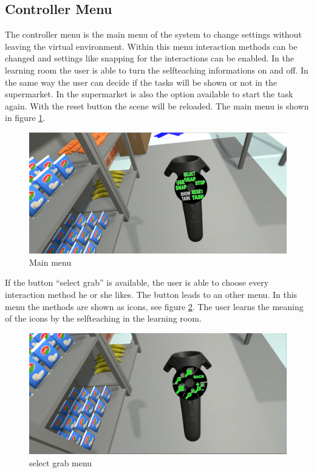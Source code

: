 \subsection{Controller Menu} \label{sec:Menu}
The controller menu is the main menu of the system to change settings without leaving the virtual environment. Within this menu interaction methods can be changed and settings like snapping for the interactions can be enabled. In the learning room	the user is able to turn the selfteaching informations on and off. In the same way the user can decide if the tasks will be shown or not in the supermarket. In the supermarket is also the option available to start the task again. With the reset button the scene will be reloaded. The main menu is shown in figure \ref{fig:mainMenu}.

\begin{figure}[H] 
	\center 
	\includegraphics[width=12cm]{Images/Menu1.PNG}
	\caption[Main menu]{Main menu}
	\label{fig:mainMenu}
\end{figure}

If the button ``select grab'' is available, the user is able to choose every interaction method he or she likes. The button leads to an other menu. In this menu the methods are shown as icons, see figure \ref{fig:grabMenu}. The user learns the meaning of the icons by the selfteaching in the learning room. 

\begin{figure}[H] 
	\center 
	\includegraphics[width=12cm]{Images/Menu2.PNG}
	\caption[select grab menu]{select grab menu}
	\label{fig:grabMenu}
\end{figure}

